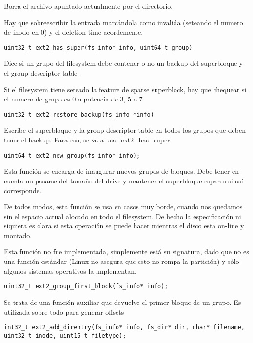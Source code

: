Borra el archivo apuntado actualmente por el directorio.

Hay que sobreescribir la entrada marcándola como invalida (seteando el numero de inodo en 0) y el deletion time acordemente. 


\begin{lstlisting}[style=customc]
uint32_t ext2_has_super(fs_info* info, uint64_t group)
\end{lstlisting}

Dice si un grupo del filesystem debe contener o no un backup del superbloque y el group descriptor table.

Si el filesystem tiene seteado la feature de sparse superblock, hay que chequear si el numero de grupo es 0 o potencia de 3, 5 o 7.


\begin{lstlisting}[style=customc]
uint32_t ext2_restore_backup(fs_info *info)
\end{lstlisting}

Escribe el superbloque y la group descriptor table en todos los grupos que deben tener el backup. Para eso, se va a usar ext2\_has\_super.


\begin{lstlisting}[style=customc]
uint64_t ext2_new_group(fs_info* info);
\end{lstlisting}

Esta función se encarga de inaugurar nuevos grupos de bloques. Debe tener en cuenta no pasarse del tamaño del drive y mantener el superbloque esparso si así corresponde.

De todos modos, esta función se usa en casos muy borde, cuando nos quedamos sin el espacio actual alocado en todo el filesystem. De hecho la especificación ni siquiera es clara si esta operación se puede hacer mientras el disco esta on-line y montado.

Esta función no fue implementada, simplemente está su signatura, dado que no es una función estándar (Linux no asegura que esto no rompa la partición) y sólo algunos sistemas operativos la implementan.



\begin{lstlisting}[style=customc]
uint32_t ext2_group_first_block(fs_info* info);
\end{lstlisting}

Se trata de una función auxiliar que devuelve el primer bloque de un grupo. Es utilizada sobre todo para generar offsets

\begin{lstlisting}[style=customc]
int32_t ext2_add_direntry(fs_info* info, fs_dir* dir, char* filename, uint32_t inode, uint16_t filetype);
\end{lstlisting}

